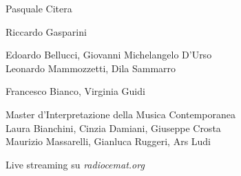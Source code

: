 Pasquale Citera

\medskip



\medskip

%

\medskip

\textbf{}

Riccardo Gasparini

\medskip

\textbf{}

Edoardo Bellucci, Giovanni Michelangelo D'Urso\\
Leonardo Mammozzetti, Dila Sammarro

\medskip

\textbf{}

Francesco Bianco, Virginia Guidi

\vfill

\textbf{}

Master d'Interpretazione della Musica Contemporanea\\
Laura Bianchini, Cinzia Damiani, Giuseppe Crosta\\
Maurizio Massarelli, Gianluca Ruggeri, Ars Ludi

Live streaming su \emph{radiocemat.org}